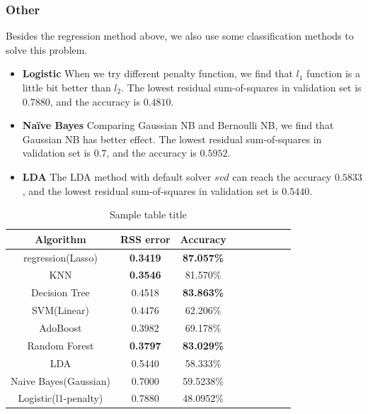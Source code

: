 \documentclass{article}
\begin{document}
\subsubsection{Other}
Besides the regression method above, we also use some classification methods to solve this problem.
\begin{itemize}
	\item \textbf{Logistic} When we try different penalty function, we find that $l_1$ function is a little bit better than $l_2$. The lowest residual sum-of-squares in validation set is $0.7880$, and the accuracy is $0.4810$.
	\item \textbf{Naïve Bayes} Comparing Gaussian NB and Bernoulli NB, we find that Gaussian NB has better effect. The lowest residual sum-of-squares in validation set is $0.7$, and the accuracy is $0.5952$.
	\item \textbf{LDA} The LDA method with default solver $svd$ can reach the accuracy $0.5833$, and the lowest residual sum-of-squares in validation set is $0.5440$.
\end{itemize}



\begin{table}
	\caption{Sample table title}
	\label{sample-table}
	\centering
	\begin{tabular}{ccccccccc}
		\toprule
		Algorithm     & RSS error     & Accuracy \\
		\midrule
		regression(Lasso) & \textbf{0.3419}  & \textbf{87.057\%}     \\
		KNN     & \textbf{0.3546} & 81.570\%     \\
		Decision Tree     & 0.4518       & \textbf{83.863\%}  \\
		SVM(Linear)     & 0.4476      & 62.206\%  \\
		AdoBoost     & 0.3982       & 69.178\% \\
		Random Forest    & \textbf{0.3797}       & \textbf{83.029\%}  \\
		LDA   & 0.5440       & 58.333\%  \\
		Naive Bayes(Gaussian)    & 0.7000       & 59.5238\%  \\
		Logistic(l1-penalty)    & 0.7880       & 48.0952\%  \\
		\bottomrule
	\end{tabular}
\end{table}
\end{document}
